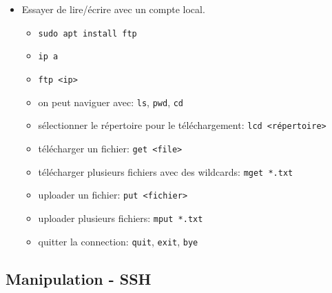 \documentclass[a4paper]{article}
\begin{document}
\begin{itemize}
\item Essayer de lire/écrire avec un compte local.
\begin{example}
    \begin{itemize}
        \item \texttt{sudo apt install ftp}
        \item \texttt{ip a}
        \item \texttt{ftp <ip>}
        \item on peut naviguer avec: \texttt{ls}, \texttt{pwd}, \texttt{cd}
        \item sélectionner le répertoire pour le téléchargement: \texttt{lcd <répertoire>}
        \item télécharger un fichier: \texttt{get <file>}
        \item télécharger plusieurs fichiers avec des wildcards: \texttt{mget *.txt}
        \item uploader un fichier: \texttt{put <fichier>}
        \item uploader plusieurs fichiers: \texttt{mput *.txt}
        \item quitter la connection: \texttt{quit}, \texttt{exit}, \texttt{bye}
    \end{itemize}
\end{example}

\end{itemize}










\subsection{Manipulation - SSH}
\end{document}
